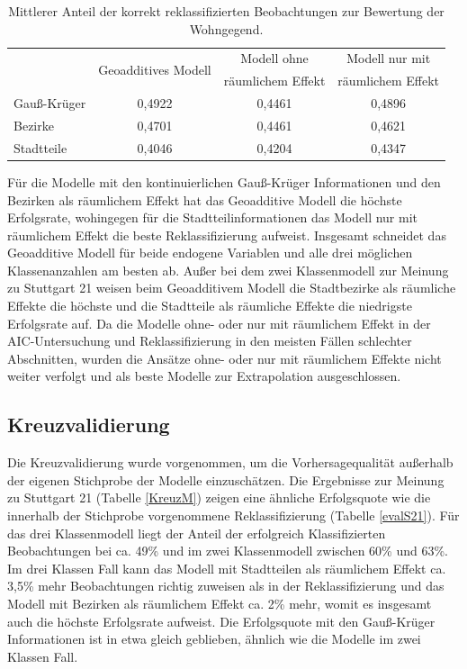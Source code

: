 \documentclass{Vorlage}
\begin{document}
\begin{table}[h]
\centering
\caption{Mittlerer Anteil der korrekt reklassifizierten Beobachtungen zur Bewertung der Wohngegend.}
\label{evalB}
\begin{tabular}{l|c|c|c}
\hline \hline
             & \multirow{2}{*}{Geoadditives Modell} & Modell ohne       & Modell nur mit    \\
             &                                      & räumlichem Effekt & räumlichem Effekt \\ \hline
Gauß-Krüger & 0,4922                               & 0,4461            & 0,4896            \\
Bezirke      & 0,4701                               & 0,4461            & 0,4621            \\
Stadtteile   & 0,4046                               & 0,4204            & 0,4347            \\ \hline \hline
\end{tabular}
\end{table}

Für die Modelle mit den kontinuierlichen Gauß-Krüger Informationen und den Bezirken als räumlichem Effekt hat das Geoadditive Modell die höchste Erfolgsrate, wohingegen für die Stadtteilinformationen das Modell nur mit räumlichem Effekt die beste Reklassifizierung aufweist. Insgesamt schneidet das Geoadditive Modell für beide endogene Variablen und alle drei möglichen Klassenanzahlen am besten ab. Außer bei dem zwei Klassenmodell zur Meinung zu Stuttgart 21 weisen beim Geoadditivem Modell die Stadtbezirke als räumliche Effekte die höchste und die Stadtteile als räumliche Effekte die niedrigste Erfolgsrate auf. Da die Modelle ohne- oder nur mit räumlichem Effekt in der AIC-Untersuchung und Reklassifizierung in den meisten Fällen schlechter Abschnitten, wurden die Ansätze ohne- oder nur mit räumlichem Effekte nicht weiter verfolgt und als beste Modelle zur Extrapolation ausgeschlossen.

\subsection{Kreuzvalidierung}

Die Kreuzvalidierung wurde vorgenommen, um die Vorhersagequalität außerhalb der eigenen Stichprobe der Modelle einzuschätzen. Die Ergebnisse zur Meinung zu Stuttgart 21 (Tabelle \ref{KreuzM}) zeigen eine ähnliche Erfolgsquote wie die innerhalb der Stichprobe vorgenommene Reklassifizierung (Tabelle \ref{evalS21}). Für das drei Klassenmodell liegt der Anteil der erfolgreich Klassifizierten Beobachtungen bei ca. 49\% und im zwei Klassenmodell zwischen 60\% und 63\%. Im drei Klassen Fall kann das Modell mit Stadtteilen als räumlichem Effekt ca. 3,5\%  mehr Beobachtungen richtig zuweisen als in der Reklassifizierung und das Modell mit Bezirken als räumlichem Effekt ca. 2\% mehr, womit es insgesamt auch die höchste Erfolgsrate aufweist. Die Erfolgsquote mit den Gauß-Krüger Informationen ist in etwa gleich geblieben, ähnlich wie die Modelle im zwei Klassen Fall.
 
\end{document}
